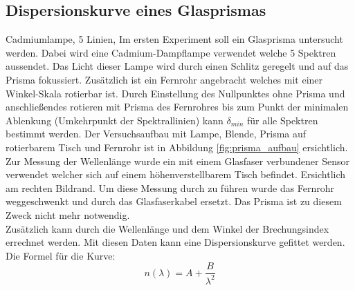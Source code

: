 \documentclass[12pt,a4paper]{article}
\begin{document}
\pagebreak
\setlength{\columnsep}{20pt}
\begin{multicols}{2}


%

\section{Dispersionskurve eines Glasprismas}
Cadmiumlampe, 5 Linien, 
Im ersten Experiment soll ein Glasprisma untersucht werden. Dabei wird eine Cadmium-Dampflampe verwendet welche 5 Spektren aussendet. Das Licht dieser Lampe wird durch einen Schlitz geregelt und auf das Prisma fokussiert. Zusätzlich ist ein Fernrohr angebracht welches mit einer Winkel-Skala rotierbar ist. Durch Einstellung des Nullpunktes ohne Prisma und anschließendes rotieren mit Prisma des Fernrohres bis zum Punkt der minimalen Ablenkung (Umkehrpunkt der Spektrallinien) kann $\delta_{min}$ für alle Spektren bestimmt werden. Der Versuchsaufbau mit Lampe, Blende, Prisma auf rotierbarem Tisch und Fernrohr ist in Abbildung \ref{fig:prisma_aufbau} ersichtlich. Zur Messung der Wellenlänge wurde ein mit einem Glasfaser verbundener Sensor verwendet welcher sich auf einem höhenverstellbarem Tisch befindet. Ersichtlich am rechten Bildrand. Um diese Messung durch zu führen wurde das Fernrohr weggeschwenkt und durch das Glasfaserkabel ersetzt. Das Prisma ist zu diesem Zweck nicht mehr notwendig.
\\ 
Zusätzlich kann durch die Wellenlänge und dem Winkel der Brechungsindex errechnet werden. Mit diesen Daten kann eine Dispersionskurve gefittet werden.\\
Die Formel für die Kurve:
$$n(\lambda) = A + \frac{B}{\lambda^2}$$


\end{multicols}
\end{document}
